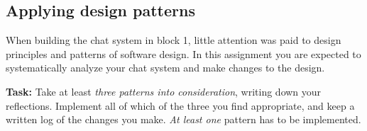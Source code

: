 \documentclass{article}
\begin{document}
  \subsection{ Applying design patterns }
    When building the chat system in block 1, little attention was paid to design principles and patterns of software design. In this assignment you are expected to systematically analyze your chat system and make changes to the design.

  \vspace{0.3cm}

  \noindent  \textbf{Task:} Take at least \emph{three patterns into consideration}, writing down your reflections. Implement all of which of the three you find appropriate, and keep a written log of the changes you make. \emph{At least one} pattern has to be implemented.
\end{document}
